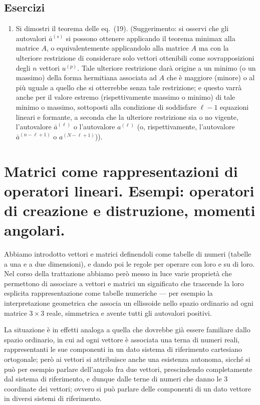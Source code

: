 \documentclass[11pt, a4paper]{book}
\numberwithin{equation}{section}
\newenvironment{esercizi}{\subsection*{Esercizi}\begin{enumerate}}{\end{enumerate}}
\begin{document}
\begin{esercizi}
\item Si dimostri il teorema delle eq.\ (19).
(Suggerimento: si osservi che gli autovalori $\bar{a}^{(s)}$ si possono
ottenere applicando il teorema minimax alla matrice $A$, o equivalentemente
applicandolo alla matrice $A$ ma con la ulteriore restrizione di considerare
solo vettori ottenibili come sovrapposizioni degli $n$ vettori $u^{(p)}$.
Tale ulteriore restrizione darà origine a un minimo (o un massimo) della
forma hermitiana associata ad $A$ che è maggiore (minore) o al più uguale a
quello che si otterrebbe senza tale restrizione; e questo varrà anche per il
valore estremo (rispettivamente massimo o minimo) di tale minimo o massimo,
sottoposti alla condizione di soddisfare $\ell-1$ equazioni lineari e
formante, a seconda che la ulteriore restrizione sia o no vigente,
l'autovalore $\bar{a}^{(\ell)}$ o l'autovalore $a^{(\ell)}$ (o,
rispettivamente, l'autovalore $\bar{a}^{(n-\ell+1)}$ o
$a^{(N-\ell+1)}$)).

\end{esercizi}

\section[matrici come rappresentazione di operatori lineari]{Matrici come rappresentazioni di operatori lineari. Esempi:
operatori di creazione e distruzione, momenti angolari.}

Abbiamo introdotto vettori e matrici definendoli come tabelle di numeri
(tabelle a una e a due dimensioni), e dando poi le regole per operare con
loro e su di loro. Nel corso della trattazione abbiamo però messo in luce
varie proprietà che permettono di associare a vettori e matrici un
significato che trascende la loro esplicita rappresentazione come tabelle
numeriche --- per esempio la interpretazione geometrica che associa un
ellissoide nello spazio ordinario ad ogni matrice $3\times3$ reale,
simmetrica e avente tutti gli autovalori positivi.

La situazione è in effetti analoga a quella che dovrebbe già essere
familiare dallo spazio ordinario, in cui ad ogni vettore è associata una
terna di numeri reali, rappresentanti le sue componenti in un dato sistema
di riferimento cartesiano ortogonale; però ai vettori si attribuisce anche
una esistenza autonoma, sicché si può per esempio parlare dell'angolo fra
due vettori, prescindendo completamente dal sistema di riferimento, e dunque
dalle terne di numeri che danno le 3 coordinate dei vettori; ovvero si può
parlare delle componenti di un dato vettore in diversi sistemi di
riferimento.
\end{document}
